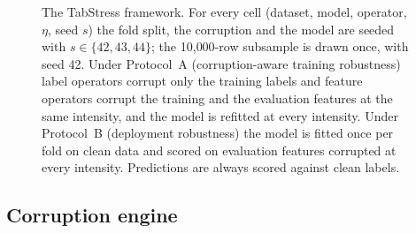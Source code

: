 \documentclass[pdflatex,sn-mathphys]{sn-jnl}
\theoremstyle{thmstyleone}
\theoremstyle{thmstyletwo}
\theoremstyle{thmstylethree}
\begin{document}
\begin{figure}[t]
{%
}
\caption{The TabStress framework. For every cell (dataset, model, operator, $\eta$, seed $s$) the fold split, the corruption and the model are seeded with $s\in\{42,43,44\}$; the 10{,}000-row subsample is drawn once, with seed 42. Under Protocol~A (corruption-aware training robustness) label operators corrupt only the training labels and feature operators corrupt the training and the evaluation features at the same intensity, and the model is refitted at every intensity. Under Protocol~B (deployment robustness) the model is fitted once per fold on clean data and scored on evaluation features corrupted at every intensity. Predictions are always scored against clean labels.}
\label{fig:pipeline}
\end{figure}

\subsection{Corruption engine}\label{sec:method:engine}
\end{document}
